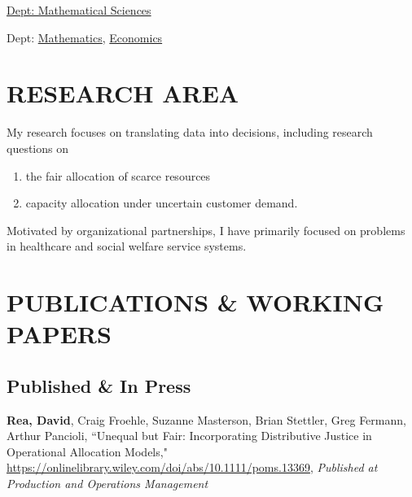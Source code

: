 \documentclass[12pt, letter]{moderncv}
\begin{document}
{\hspace*{.35in}\href{https://www.clemson.edu/science/departments/math-stat/}{ Dept: Mathematical Sciences}}{}{}


{\hspace*{.35in} Dept: \href{https://www.wittenberg.edu/academics/math}{Mathematics}, \href{https://www.wittenberg.edu/academics/economics}{Economics}}{}{}{}

\smallskip
\section{RESEARCH AREA}
\smallskip
My research focuses on translating data into decisions, including research questions on
\smallskip 
\begin{enumerate}[\hspace{0.5cm}(1)]
	\item the fair allocation of scarce resources
	\item capacity allocation under uncertain customer demand.
\end{enumerate}
Motivated by organizational partnerships, I have primarily focused on problems in healthcare and social welfare service systems.
\smallskip
\section{PUBLICATIONS \& WORKING PAPERS}
\smallskip
\subsection{Published \& In Press}
\smallskip
\textbf{Rea, David}, Craig Froehle, Suzanne Masterson, Brian Stettler, Greg Fermann, Arthur Pancioli, ``Unequal but Fair: Incorporating Distributive Justice in Operational Allocation Models," \url{https://onlinelibrary.wiley.com/doi/abs/10.1111/poms.13369},\newline
\textit{Published at Production and Operations Management}\\
\end{document}
